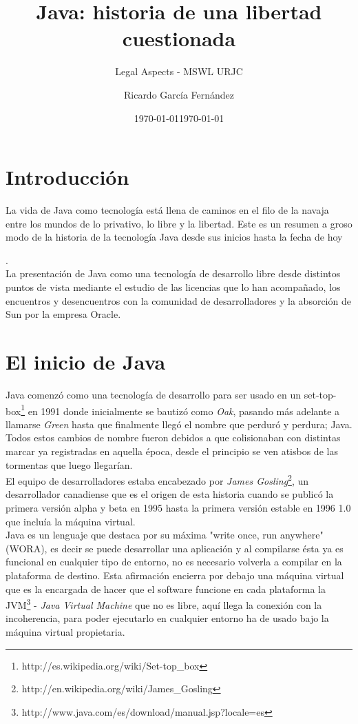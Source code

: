 \documentclass[11pt]{scrartcl}
\title{\textbf{Java: historia de una libertad cuestionada}}
\subtitle{Legal Aspects - MSWL URJC}
\author{Ricardo García Fernández}
\date{\today}
\begin{document}
\maketitle


\section{Introducción}

La vida de Java como tecnología está llena de caminos en el filo de la navaja entre los mundos de lo privativo, lo libre y la libertad. Este es un resumen a groso modo de la historia de la tecnología Java desde sus inicios hasta la fecha de hoy \date{\today}.\\
La presentación de Java como una tecnología de desarrollo libre desde distintos puntos de vista mediante el estudio de las licencias que lo han acompañado, los encuentros y desencuentros con la comunidad de desarrolladores y la absorción de Sun por la empresa Oracle.

\section{El inicio de Java}

Java comenzó como una tecnología de desarrollo para ser usado en un set-top-box\footnote{http://es.wikipedia.org/wiki/Set-top\_box} en 1991 donde inicialmente se bautizó como \emph{Oak}, pasando más adelante a llamarse \emph{Green} hasta que finalmente llegó el nombre que perduró y perdura; Java.
Todos estos cambios de nombre fueron debidos a que colisionaban con distintas marcar ya registradas en aquella época, desde el principio se ven atisbos de las tormentas que luego llegarían.\\
El equipo de desarrolladores estaba encabezado por \emph{James Gosling}\footnote{http://en.wikipedia.org/wiki/James\_Gosling}, un desarrollador canadiense que es el origen de esta historia cuando se publicó la primera versión alpha y beta en 1995 hasta la primera versión estable en 1996 1.0 que incluía la máquina virtual.\\
Java es un lenguaje que destaca por su máxima "write once, run anywhere" (WORA), es decir se puede desarrollar una aplicación y al compilarse ésta ya es funcional en cualquier tipo de entorno, no es necesario volverla a compilar en la plataforma de destino. Esta afirmación encierra por debajo una máquina virtual que es la encargada de hacer que el software funcione en cada plataforma la JVM\footnote{http://www.java.com/es/download/manual.jsp?locale=es} - \emph{Java Virtual Machine} que no es libre, aquí llega la conexión con la incoherencia, para poder ejecutarlo en cualquier entorno ha de usado bajo la máquina virtual propietaria.
\end{document}
